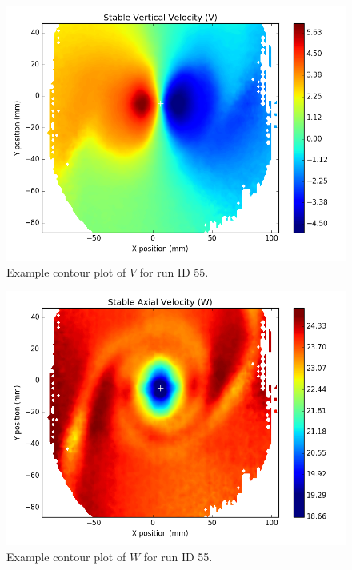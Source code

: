 \begin{figure}[H]
	\centering
	\includegraphics[width=5in]{figs/example_vortex_figs/example_V_contour}
\caption{Example contour plot of $V$ for run ID 55.}
\label{fig:examp_V}
\end{figure}

\begin{figure}[H]
	\centering
	\includegraphics[width=5in]{figs/example_vortex_figs/example_W_contour}
\caption{Example contour plot of $W$ for run ID 55.}
\label{fig:examp_W}
\end{figure}

